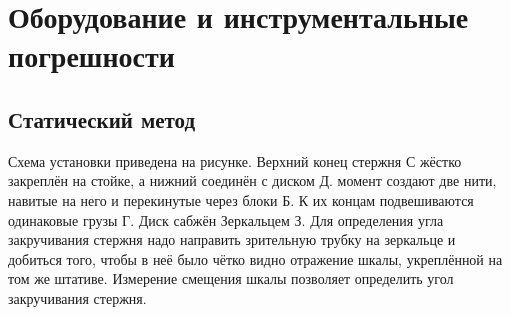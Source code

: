 \section{Оборудование и инструментальные погрешности}
\subsection{Статический метод}

\begin{figure}[h!]
\end{figure}

Схема установки приведена на рисунке. Верхний конец стержня С
жёстко закреплён на стойке, а нижний соединён с диском Д. момент
создают две нити, навитые на него и перекинутые через блоки Б. К
их концам подвешиваются одинаковые грузы Г. Диск сабжён Зеркальцем
З. Для определения угла закручивания стержня надо направить зрительную
трубку на зеркальце и добиться того, чтобы в неё было чётко видно
отражение шкалы, укреплённой на том же штативе. Измерение смещения
шкалы позволяет определить угол закручивания стержня.

